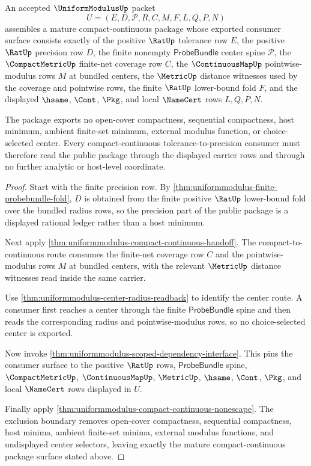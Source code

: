 \begin{theorem}
\label{thm:uniform-modulus-mature-compact-continuous-package}
An accepted $\UniformModulusUp$ packet
$$
U=(E,D,\mathcal{P},R,C,M,F,L,Q,P,N)
$$
assembles a mature compact-continuous package whose exported consumer surface consists exactly of the positive $\RatUp$ tolerance row $E$, the positive $\RatUp$ precision row $D$, the finite nonempty $\mathsf{ProbeBundle}$ center spine $\mathcal{P}$, the $\CompactMetricUp$ finite-net coverage row $C$, the $\ContinuousMapUp$ pointwise-modulus rows $M$ at bundled centers, the $\MetricUp$ distance witnesses used by the coverage and pointwise rows, the finite $\RatUp$ lower-bound fold $F$, and the displayed $\hsame$, $\Cont$, $\Pkg$, and local $\NameCert$ rows $L,Q,P,N$.

The package exports no open-cover compactness, sequential compactness, host minimum, ambient finite-set minimum, external modulus function, or choice-selected center. Every compact-continuous tolerance-to-precision consumer must therefore read the public package through the displayed carrier rows and through no further analytic or host-level coordinate.
\end{theorem}
\begin{proof}
Start with the finite precision row. By \autoref{thm:uniformmodulus-finite-probebundle-fold}, $D$ is obtained from the finite positive $\RatUp$ lower-bound fold over the bundled radius rows, so the precision part of the public package is a displayed rational ledger rather than a host minimum.

Next apply \autoref{thm:uniformmodulus-compact-continuous-handoff}. The compact-to-continuous route consumes the finite-net coverage row $C$ and the pointwise-modulus rows $M$ at bundled centers, with the relevant $\MetricUp$ distance witnesses read inside the same carrier.

Use \autoref{thm:uniformmodulus-center-radius-readback} to identify the center route. A consumer first reaches a center through the finite $\mathsf{ProbeBundle}$ spine and then reads the corresponding radius and pointwise-modulus rows, so no choice-selected center is exported.

Now invoke \autoref{thm:uniformmodulus-scoped-dependency-interface}. This pins the consumer surface to the positive $\RatUp$ rows, $\mathsf{ProbeBundle}$ spine, $\CompactMetricUp$, $\ContinuousMapUp$, $\MetricUp$, $\hsame$, $\Cont$, $\Pkg$, and local $\NameCert$ rows displayed in $U$.

Finally apply \autoref{thm:uniformmodulus-compact-continuous-nonescape}. The exclusion boundary removes open-cover compactness, sequential compactness, host minima, ambient finite-set minima, external modulus functions, and undisplayed center selectors, leaving exactly the mature compact-continuous package surface stated above.
\end{proof}


